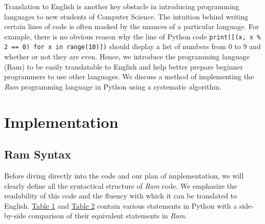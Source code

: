 \documentclass[11pt]{article}
\begin{document}
Translation to English is another key obstacle in introducing programming languages to new students of Computer Science. The intuition behind writing certain lines of code is often masked by the nuances of a particular language. For example, there is no obvious reason why the line of Python code \texttt{print([(x, x \% 2 == 0) for x in range(10)])} should display a list of numbers from 0 to 9 and whether or not they are even. Hence, {we introduce the programming language (Ram) to be easily translatable to English and help better prepare beginner programmers to use other languages.} We discuss a method of implementing the \emph{Ram} programming language in Python using a systematic algorithm.

\section{Implementation}

\subsection{Ram Syntax}

Before diving directly into the code and our plan of implementation, we will clearly define all the syntactical structure of \emph{Ram} code. We emphasize the readability of this code and the fluency with which it can be translated to English. \hyperlink{tab1}{Table 1} and \hyperlink{tab2}{Table 2} contain various statements in Python with a side-by-side comparison of their equivalent statements in \emph{Ram}.
\end{document}
